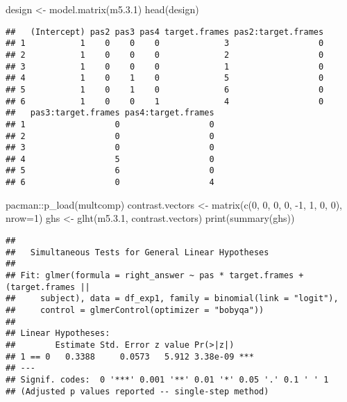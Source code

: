 \documentclass[
]{article}
\newenvironment{Shaded}{\begin{snugshade}}{\end{snugshade}}
\newcommand{\AttributeTok}[1]{\textcolor[rgb]{0.77,0.63,0.00}{#1}}
\newcommand{\DecValTok}[1]{\textcolor[rgb]{0.00,0.00,0.81}{#1}}
\newcommand{\FloatTok}[1]{\textcolor[rgb]{0.00,0.00,0.81}{#1}}
\newcommand{\FunctionTok}[1]{\textcolor[rgb]{0.00,0.00,0.00}{#1}}
\newcommand{\NormalTok}[1]{#1}
\newcommand{\OtherTok}[1]{\textcolor[rgb]{0.56,0.35,0.01}{#1}}
\newcommand{\SpecialCharTok}[1]{\textcolor[rgb]{0.00,0.00,0.00}{#1}}
\begin{document}
\begin{Shaded}
\begin{Highlighting}[]
\NormalTok{design }\OtherTok{\textless{}{-}} \FunctionTok{model.matrix}\NormalTok{(m5.}\FloatTok{3.1}\NormalTok{)}
\FunctionTok{head}\NormalTok{(design)}
\end{Highlighting}
\end{Shaded}

\begin{verbatim}
##   (Intercept) pas2 pas3 pas4 target.frames pas2:target.frames
## 1           1    0    0    0             3                  0
## 2           1    0    0    0             2                  0
## 3           1    0    0    0             1                  0
## 4           1    0    1    0             5                  0
## 5           1    0    1    0             6                  0
## 6           1    0    0    1             4                  0
##   pas3:target.frames pas4:target.frames
## 1                  0                  0
## 2                  0                  0
## 3                  0                  0
## 4                  5                  0
## 5                  6                  0
## 6                  0                  4
\end{verbatim}

\begin{Shaded}
\begin{Highlighting}[]
\NormalTok{pacman}\SpecialCharTok{::}\FunctionTok{p\_load}\NormalTok{(multcomp)}
\NormalTok{contrast.vectors }\OtherTok{\textless{}{-}} \FunctionTok{matrix}\NormalTok{(}\FunctionTok{c}\NormalTok{(}\DecValTok{0}\NormalTok{, }\DecValTok{0}\NormalTok{, }\DecValTok{0}\NormalTok{, }\DecValTok{0}\NormalTok{, }\SpecialCharTok{{-}}\DecValTok{1}\NormalTok{, }\DecValTok{1}\NormalTok{, }\DecValTok{0}\NormalTok{, }\DecValTok{0}\NormalTok{), }\AttributeTok{nrow=}\DecValTok{1}\NormalTok{)}
\NormalTok{ghs }\OtherTok{\textless{}{-}} \FunctionTok{glht}\NormalTok{(m5.}\FloatTok{3.1}\NormalTok{, contrast.vectors)}
\FunctionTok{print}\NormalTok{(}\FunctionTok{summary}\NormalTok{(ghs))}
\end{Highlighting}
\end{Shaded}

\begin{verbatim}
## 
##   Simultaneous Tests for General Linear Hypotheses
## 
## Fit: glmer(formula = right_answer ~ pas * target.frames + (target.frames || 
##     subject), data = df_exp1, family = binomial(link = "logit"), 
##     control = glmerControl(optimizer = "bobyqa"))
## 
## Linear Hypotheses:
##        Estimate Std. Error z value Pr(>|z|)    
## 1 == 0   0.3388     0.0573   5.912 3.38e-09 ***
## ---
## Signif. codes:  0 '***' 0.001 '**' 0.01 '*' 0.05 '.' 0.1 ' ' 1
## (Adjusted p values reported -- single-step method)
\end{verbatim}
\end{document}

